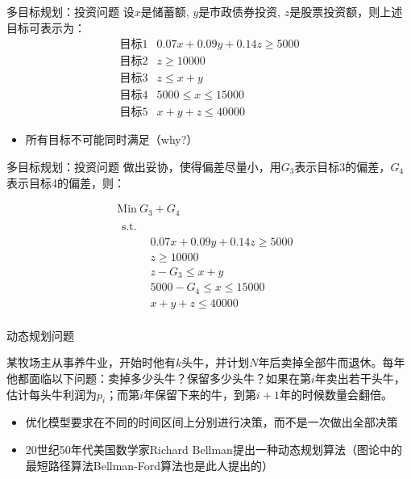 \documentclass[UTF8]{ctexbeamer}
\begin{document}
\begin{frame}{多目标规划：投资问题}
  设$x$是储蓄额, $y$是市政债券投资, $z$是股票投资额，则上述目标可表示为：
  \[
  \left.
    \begin{array}{lr}
      \text{目标1} & 0.07x + 0.09y + 0.14z \ge 5000\\
      \text{目标2} & z \ge 10000\\
      \text{目标3} & z \le x + y\\
      \text{目标4} & 5000 \le x  \le 15000\\
      \text{目标5} & x+y+z \le 40000
    \end{array}
  \right.
  \]

  \begin{itemize}
  \item 所有目标不可能同时满足（why?）
  \end{itemize}

\end{frame}

\begin{frame}{多目标规划：投资问题}
  做出妥协，使得偏差尽量小，用$G_3$表示目标3的偏差，$G_4$表示目标4的偏差，则：

    \[ 
    \begin{array}{c}
      \mbox{Min}\ G_3+G_4\\
      \begin{array}{ll}
        \mbox{s.t.} & \\
        &
        \begin{array}{l}
          0.07x + 0.09y + 0.14z \ge 5000\\
          z \ge 10000\\
          z - G_3 \le x + y\\
          5000 -G_4 \le x  \le 15000\\
          x+y+z \le 40000
        \end{array}
      \end{array}
    \end{array}
    \]
  
\end{frame}

\begin{frame}{动态规划问题}
  \begin{block}{}
    某牧场主从事养牛业，开始时他有$k$头牛，并计划$N$年后卖掉全部牛而退休。每年他都面临以下问题：卖掉多少头牛？保留多少头牛？如果在第$i$年卖出若干头牛，估计每头牛利润为$p_i$；而第$i$年保留下来的牛，到第$i+1$年的时候数量会翻倍。
  \end{block}
  
  \begin{itemize}
  \item 优化模型要求在不同的时间区间上分别进行决策，而不是一次做出全部决策
  \item 20世纪50年代美国数学家Richard Bellman提出一种动态规划算法（图论中的最短路径算法Bellman-Ford算法也是此人提出的）
  \end{itemize}
\end{frame}
\end{document}
